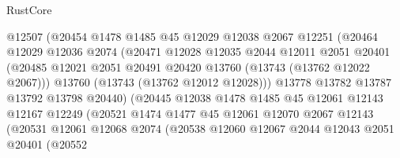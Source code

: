 \begin{lexlean}{RustCore}
\begin{coremodule}
                            @12507
                            (@20454
                              @1478
                              @1485
                              @45
                              @12029
                              @12038
                              @2067
                              @12251
                              (@20464
                                @12029
                                @12036
                                @2074
                                (@20471
                                  @12028
                                  @12035
                                  @2044
                                  @12011
                                  @2051
                                  @20401
                                  (@20485
                                    @12021
                                    @2051
                                    @20491
                                    @20420
                                    @13760
                                    (@13743 (@13762 @12022 @2067)))
                                  @13760
                                  (@13743 (@13762 @12012 @12028)))
                                @13778
                                @13782
                                @13787
                                @13792
                                @13798
                                @20440)
                              (@20445
                                @12038
                                @1478
                                @1485
                                @45
                                @12061
                                @12143
                                @12167
                                @12249
                                (@20521
                                  @1474
                                  @1477
                                  @45
                                  @12061
                                  @12070
                                  @2067
                                  @12143
                                  (@20531
                                    @12061
                                    @12068
                                    @2074
                                    (@20538
                                      @12060
                                      @12067
                                      @2044
                                      @12043
                                      @2051
                                      @20401
                                      (@20552

\end{coremodule}
\end{lexlean}
